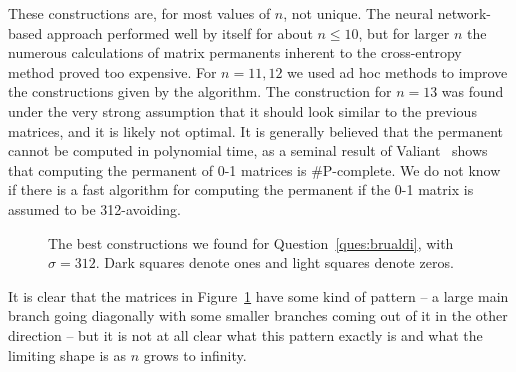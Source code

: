 \documentclass[11pt,english]{article}
\theoremstyle{plain}
\theoremstyle{remark}
\begin{document}
These constructions are, for most values of $n$, not unique. The neural network-based approach performed well by itself for about $n\leq 10$, but for larger $n$ the numerous calculations of matrix permanents inherent to the cross-entropy method proved too expensive. For $n=11,12$ we used ad hoc methods to improve the constructions given by the algorithm. The construction for $n=13$ was found under the very strong assumption that it should look similar to the previous matrices, and it is likely not optimal. It is generally believed that the permanent cannot be computed in polynomial time, as a seminal result of Valiant~\cite{valiant} shows that computing the permanent of 0-1 matrices is \#P-complete.  We do not know if there is a fast algorithm for computing the permanent if the 0-1 matrix is assumed to be 312-avoiding.



\begin{figure}[hbt]
    \centering
    

\hspace{0.7 cm}

\hspace{0.7 cm}

\hspace{0.7 cm}

\hspace{0.7 cm}



\hspace{1.0 cm}

\hspace{1.0 cm}

\hspace{1.0 cm}



\hspace{0.2 cm}

\hspace{0.2 cm}

\hspace{0.2 cm}



\caption{The best constructions we found for Question~\ref{ques:brualdi}, with $\sigma = 312$. Dark squares denote ones and light squares denote zeros.}
    \label{fig:brualdi1}
\end{figure}

It is clear that the matrices in Figure~\ref{fig:brualdi1} have some kind of pattern -- a large main branch going diagonally with some smaller branches coming out of it in the other direction -- but it is not at all clear what this pattern exactly is and what the limiting shape is as $n$ grows to infinity. 
\end{document}
